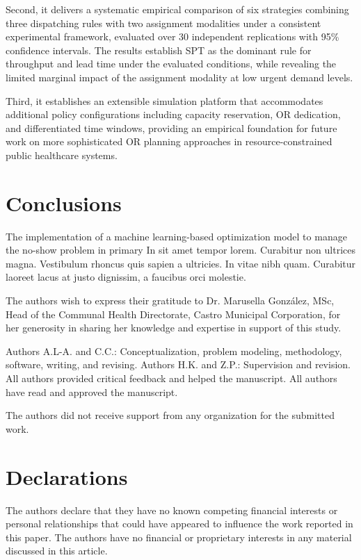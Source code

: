 \documentclass[sn-mathphys-num]{sn-jnl}
\begin{document}
Second, it delivers a systematic empirical comparison of six
strategies combining three dispatching rules with two assignment
modalities under a consistent experimental framework, evaluated
over 30 independent replications with 95\% confidence intervals.
The results establish SPT as the dominant rule for throughput and
lead time under the evaluated conditions, while revealing the
limited marginal impact of the assignment modality at low urgent
demand levels.

Third, it establishes an extensible simulation platform that
accommodates additional policy configurations including capacity
reservation, OR dedication, and differentiated time windows,
providing an empirical foundation for future work on more
sophisticated OR planning approaches in resource-constrained
public healthcare systems.


\section{Conclusions}
The implementation of a machine learning-based optimization model to manage the no-show problem in primary In sit amet tempor lorem. Curabitur non ultrices magna. Vestibulum rhoncus quis sapien a ultricies. In vitae nibh quam. Curabitur laoreet lacus at justo dignissim, a faucibus orci molestie. 
 

\backmatter

The authors wish to express their gratitude to Dr. Marusella González, MSc, Head of the Communal Health Directorate, Castro Municipal Corporation, for her generosity in sharing her knowledge and expertise in support of this study.

Authors A.L-A. and C.C.: Conceptualization, problem modeling, methodology, software, writing, and revising. Authors H.K. and Z.P.: Supervision and revision. All authors provided critical feedback and helped the manuscript. All authors have read and approved the manuscript. 

The authors did not receive support from any organization for the submitted work.


\section*{Declarations}

The authors declare that they have no known competing
financial interests or personal relationships that could have
appeared to influence the work reported in this paper.
The authors have no financial or proprietary interests in any material discussed in this article.
%
%
%
%
%

\end{document}
